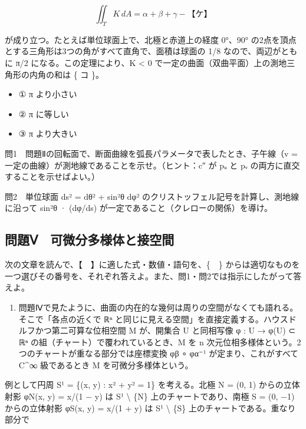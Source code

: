 \documentclass[
  10pt,
  a4paper,
]{article}
\providecommand{\tightlist}{%
  \setlength{\itemsep}{0pt}\setlength{\parskip}{0pt}}
\begin{document}
\[\iint_T K\, dA = \alpha + \beta + \gamma - \text{【ケ】}\]

が成り立つ。たとえば単位球面上で、北極と赤道上の経度 0°、90°
の2点を頂点とする三角形は3つの角がすべて直角で、面積は球面の 1/8
なので、両辺がともに π/2 になる。この定理により、K \textless{} 0
で一定の曲面（双曲平面）上の測地三角形の内角の和は \{ コ \}。

\begin{itemize}
\tightlist
\item
  ① π より小さい
\item
  ② π に等しい
\item
  ③ π より大きい
\end{itemize}

問1　問題Ⅱの回転面で、断面曲線を弧長パラメータで表したとき、子午線（v =
一定の曲線）が測地線であることを示せ。（ヒント：c″ が p{\fallbackfont ᵤ}
と p{\fallbackfont ᵥ} の両方に直交することを示せばよい。）

問2　単位球面 ds² = dθ² + sin²θ dφ²
のクリストッフェル記号を計算し、測地線に沿って sin²θ · (dφ/ds)
が一定であること（クレローの関係）を導け。

\hypertarget{ux554fux984cux2174-ux53efux5faeux5206ux591aux69d8ux4f53ux3068ux63a5ux7a7aux9593}{%
\subsection{問題Ⅴ　可微分多様体と接空間}\label{ux554fux984cux2174-ux53efux5faeux5206ux591aux69d8ux4f53ux3068ux63a5ux7a7aux9593}}

次の文章を読んで、【　】に適した式・数値・語句を、\{　\}
からは適切なものを一つ選びその番号を、それぞれ答えよ。また、問1・問2では指示にしたがって答えよ。

\begin{enumerate}
\def\labelenumi{(\arabic{enumi})}
\tightlist
\item
  問題Ⅳで見たように、曲面の内在的な幾何は周りの空間がなくても語れる。そこで「各点の近くで
  {\fallbackfont ℝⁿ}
  と同じに見える空間」を直接定義する。ハウスドルフかつ第二可算な位相空間
  M が、開集合 U と同相写像 φ : U → φ(U) ⊂ {\fallbackfont ℝⁿ}
  の組（チャート）で覆われているとき、M を n
  次元位相多様体という。2つのチャートが重なる部分では座標変換 φβ
  {\fallbackfont ∘} φα{\fallbackfont ⁻}¹ が定まり、これがすべて C\^{}∞
  級であるとき M を可微分多様体という。
\end{enumerate}

例として円周 S¹ = \{(x, y) : x² + y² = 1\} を考える。北極 N = (0, 1)
からの立体射影 φN(x, y) = x/(1 − y) は S¹ \textbackslash{} \{N\}
上のチャートであり、南極 S = (0, −1) からの立体射影 φS(x, y) = x/(1 + y)
は S¹ \textbackslash{} \{S\} 上のチャートである。重なり部分で
\end{document}
